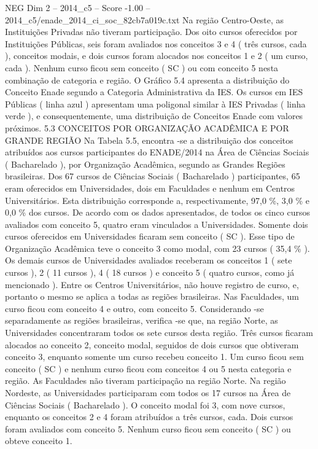 \begin{textsample}{NEG Dim 2 – 2014\_c5 – Score -1.00 – 2014\_c5/enade\_2014\_ci\_soc\_82cb7a019c.txt}
Na região Centro-Oeste, as Instituições Privadas não tiveram participação.
Dos oito cursos oferecidos por Instituições Públicas, seis foram avaliados nos conceitos 3 e 4 ( três cursos, cada ), conceitos modais, e dois cursos foram alocados nos conceitos 1 e 2 ( um curso, cada ).
Nenhum curso ficou sem conceito ( SC ) ou com conceito 5 nesta combinação de categoria e região.
O Gráfico 5.4 apresenta a distribuição do Conceito Enade segundo a Categoria Administrativa da IES.
Os cursos em IES Públicas ( linha azul ) apresentam uma poligonal similar à IES Privadas ( linha verde ), e consequentemente, uma distribuição de Conceitos Enade com valores próximos. 5.3 CONCEITOS POR ORGANIZAÇÃO ACADÊMICA E POR GRANDE REGIÃO Na Tabela 5.5, encontra -se a distribuição dos conceitos atribuídos aos cursos participantes do ENADE/2014 na Área de Ciências Sociais ( Bacharelado ), por Organização Acadêmica, segundo as Grandes Regiões brasileiras.
Dos 67 cursos de Ciências Sociais ( Bacharelado ) participantes, 65 eram oferecidos em Universidades, dois em Faculdades e nenhum em Centros Universitários.
Esta distribuição corresponde a, respectivamente, 97,0 \%, 3,0 \% e 0,0 \% dos cursos.
De acordo com os dados apresentados, de todos os cinco cursos avaliados com conceito 5, quatro eram vinculados a Universidades.
Somente dois cursos oferecidos em Universidades ficaram sem conceito ( SC ).
Esse tipo de Organização Acadêmica teve o conceito 3 como modal, com 23 cursos ( 35,4 \% ).
Os demais cursos de Universidades avaliados receberam os conceitos 1 ( sete cursos ), 2 ( 11 cursos ), 4 ( 18 cursos ) e conceito 5 ( quatro cursos, como já mencionado ).
Entre os Centros Universitários, não houve registro de curso, e, portanto o mesmo se aplica a todas as regiões brasileiras.
Nas Faculdades, um curso ficou com conceito 4 e outro, com conceito 5.
Considerando -se separadamente as regiões brasileiras, verifica -se que, na região Norte, as Universidades concentraram todos os sete cursos desta região.
Três cursos ficaram alocados ao conceito 2, conceito modal, seguidos de dois cursos que obtiveram conceito 3, enquanto somente um curso recebeu conceito 1.
Um curso ficou sem conceito ( SC ) e nenhum curso ficou com conceitos 4 ou 5 nesta categoria e região.
As Faculdades não tiveram participação na região Norte.
Na região Nordeste, as Universidades participaram com todos os 17 cursos na Área de Ciências Sociais ( Bacharelado ).
O conceito modal foi 3, com nove cursos, enquanto os conceitos 2 e 4 foram atribuídos a três cursos, cada.
Dois cursos foram avaliados com conceito 5.
Nenhum curso ficou sem conceito ( SC ) ou obteve conceito 1.

\end{textsample}
